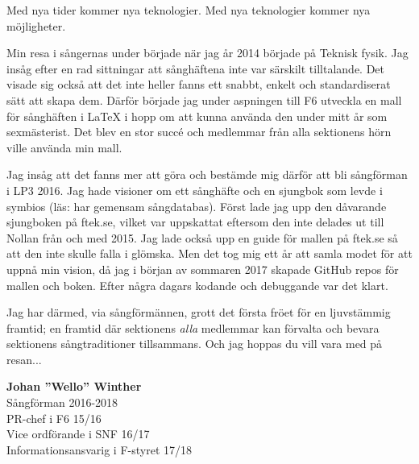 {\large
Med nya tider kommer nya teknologier.
Med nya teknologier kommer nya möjligheter.

Min resa i sångernas under började när jag år 2014 började på Teknisk fysik. Jag insåg efter en rad sittningar att sånghäftena inte var särskilt tilltalande. Det visade sig också att det inte heller fanns ett snabbt, enkelt och standardiserat sätt att skapa dem.
Därför började jag under aspningen till F6 utveckla en mall för sånghäften i LaTeX i hopp om att kunna använda den under mitt år som sexmästerist.
Det blev en stor succé och medlemmar från alla sektionens hörn ville använda min mall.

Jag insåg att det fanns mer att göra och bestämde mig därför att bli sångförman i LP3 2016.
Jag hade visioner om ett sånghäfte och en sjungbok som levde i symbios (läs: har gemensam sångdatabas).
Först lade jag upp den dåvarande sjungboken på ftek.se, vilket var uppskattat eftersom den inte delades ut till Nollan från och med 2015.
Jag lade också upp en guide för mallen på ftek.se så att den inte skulle falla i glömska.
Men det tog mig ett år att samla modet för att uppnå min vision, då jag i början av sommaren 2017 skapade GitHub repos för mallen och boken.
Efter några dagars kodande och debuggande var det klart.

Jag har därmed, via sångförmännen, grott det första fröet för en ljuvstämmig framtid; en framtid där sektionens \emph{alla} medlemmar kan förvalta och bevara sektionens sångtraditioner tillsammans. Och jag hoppas du vill vara med på resan...

\vspace{0.5cm}
\begin{flushright}
\textbf{Johan ''Wello'' Winther}\\
Sångförman 2016-2018\\
PR-chef i F6 15/16\\
Vice ordförande i SNF 16/17\\
Informationsansvarig i F-styret 17/18\\
\end{flushright}
}

\newpage


